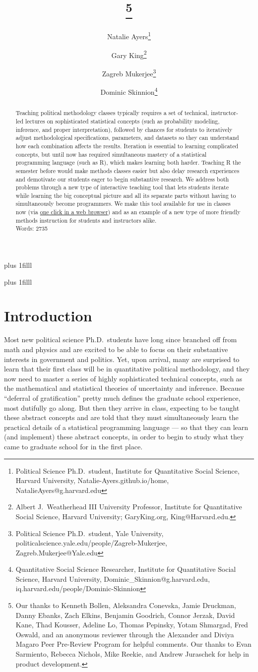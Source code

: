 \documentclass[12pt]{article}
\title{\titl}
\title{\titl\thanks{Our thanks to Kenneth Bollen, Aleksandra Conevska, Jamie Druckman, Danny Ebanks, Zach Elkins, Benjamin Goodrich, Connor Jerzak, David Kane, Thad Kousser, Adeline Lo, Thomas Pepinsky, Yotam Shmargad, Fred Oswald, and an anonymous reviewer through the Alexander and Diviya Magaro Peer Pre-Review Program for helpful comments. Our thanks to Evan Sarmiento, Rebecca Nichols, Mike Reekie, and Andrew Juraschek for help in product development.}}
\author{Natalie Ayers\thanks{Political Science Ph.D.\ student, Institute for Quantitative Social Science, Harvard University, Natalie-Ayers.github.io/home, NatalieAyers@g.harvard.edu}\and Gary King\thanks{Albert J.\ Weatherhead
III University Professor, Institute for Quantitative Social
Science, Harvard University; GaryKing.org, King@Harvard.edu.}\and Zagreb Mukerjee\thanks{Political Science Ph.D.\ student, Yale University, politicalscience.yale.edu/people/Zagreb-Mukerjee, Zagreb.Mukerjee@Yale.edu} \and Dominic Skinnion\thanks{Quantitative Social Science Researcher, Institute for Quantitative Social Science, Harvard University, Dominic\_Skinnion@g.harvard.edu, iq.harvard.edu/people/Dominic-Skinnion}}
\newcommand{\btVFill}{\vskip0pt plus 1filll}
\theoremstyle{definition}
\begin{document}
\maketitle\thispagestyle{empty}\setcounter{page}{0}
\btVFill
\vspace{-2\baselineskip}
\begin{abstract}
  \noindent Teaching political methodology classes typically requires a set of technical, instructor-led lectures on sophisticated statistical concepts (such as probability modeling, inference, and proper interpretation), followed by chances for students to iteratively adjust methodological specifications, parameters, and datasets so they can understand how each combination affects the results. Iteration is essential to learning complicated concepts, but until now has required simultaneous mastery of a statistical programming language (such as R), which makes learning both harder. Teaching R the semester before would make methods classes easier but also delay research experiences and demotivate our students eager to begin substantive research. We address both problems through a new type of interactive teaching tool that lets students iterate while learning the big conceptual picture and all its separate parts without having to simultaneously become programmers.  We make this tool available for use in classes now (via \href{https://2k1.iq.harvard.edu}{one click in a web browser}) and as an example of a new type of more friendly methods instruction for students and instructors alike.
  \\
  \newline
  \noindent Words: 2735
\end{abstract}
\btVFill
\clearpage
{}\baselineskip

\section{Introduction}\label{s:intro}

Most new political science Ph.D.\ students have long since branched off from math and physics and are excited to be able to focus on their substantive interests in government and politics. Yet, upon arrival, many are surprised to learn that their first class will be in quantitative political methodology, and they now need to master a series of highly sophisticated technical concepts, such as the mathematical and statistical theories of uncertainty and inference. Because ``deferral of gratification'' pretty much defines the graduate school experience, most dutifully go along. But then they arrive in class, expecting to be taught these abstract concepts and are told that they must simultaneously learn the practical details of a statistical programming language --- so that they can learn (and implement) these abstract concepts, in order to begin to study what they came to graduate school for in the first place. 
\end{document}

